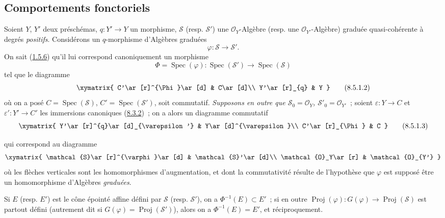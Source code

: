 \subsection{Comportements fonctoriels}
\label{subsection:II.8.5-fr}

\begin{env}[8.5.1]
\label{II.8.5.1-fr}
Soient $Y$, $Y'$ deux préschémas, $q:Y'\to Y$ un morphisme,
$\mathcal{S}$ (resp. $\mathcal{S}'$) une $\mathcal{O}_Y$-Algèbre
(resp. une $\mathcal{O}_{Y'}$-Algèbre) graduée quasi-cohérente à degrés
\emph{positifs}. Considérons un $q$-morphisme d'Algèbres graduées
\begin{equation}
\label{II.8.5.1.1-fr}
  \varphi:\mathcal{S}\to\mathcal{S}'.
\tag{8.5.1.1}
\end{equation}
On sait (\hyperref[II.1.5.6-fr]{1.5.6}) qu'il lui correspond canoniquement un
morphisme
\[
  \Phi=\operatorname{Spec}(\varphi):
  \operatorname{Spec}(\mathcal{S}')\to\operatorname{Spec}(\mathcal{S})
\]
tel que le diagramme
\begin{equation}
\label{II.8.5.1.2-fr}
  \xymatrix{
    C'\ar[r]^{\Phi}\ar[d] & C\ar[d]\\
    Y'\ar[r]_{q} & Y
  }
\tag{8.5.1.2}
\end{equation}
où on a posé $C=\operatorname{Spec}(\mathcal{S})$,
$C'=\operatorname{Spec}(\mathcal{S}')$, soit commutatif. 
\emph{Supposons en outre que
$\mathcal{S}_0=\mathcal{O}_Y$, $\mathcal{S}'_0=\mathcal{O}_{Y'}$}~; soient
$\varepsilon:Y\to C$ et $\varepsilon':Y'\to C'$ les immersions canoniques
(\hyperref[II.8.3.2-fr]{8.3.2})~; on a alors un diagramme commutatif
\begin{equation}
\label{II.8.5.1.3-fr}
  \xymatrix{
    Y'\ar[r]^{q}\ar[d]_{\varepsilon'} & Y\ar[d]^{\varepsilon}\\
    C'\ar[r]_{\Phi} & C
  }
\tag{8.5.1.3}
\end{equation}

qui correspond au diagramme
\[
  \xymatrix{
    \mathcal{S}\ar[r]^{\varphi}\ar[d] & \mathcal{S}'\ar[d]\\
    \mathcal{O}_Y\ar[r] & \mathcal{O}_{Y'}
  }
\]
où les flèches verticales sont les homomorphismes d'augmentation, et dont la
commutativité résulte de l'hypothèse que $\varphi$ est supposé être un
homomorphisme d'Algèbres \emph{graduées}.
\end{env}

\begin{proposition}[8.5.2]
\label{II.8.5.2-fr}
Si $E$ (resp. $E'$) est le cône épointé affine défini par $\mathcal{S}$
(resp. $\mathcal{S}'$), on a $\Phi^{-1}(E)\subset E'$~; si en outre
$\operatorname{Proj}(\varphi):G(\varphi)\to\operatorname{Proj}(\mathcal{S})$
est partout défini (autrement dit si
$G(\varphi)=\operatorname{Proj}(\mathcal{S}')$), alors on a
$\Phi^{-1}(E)=E'$, et réciproquement.
\end{proposition}

